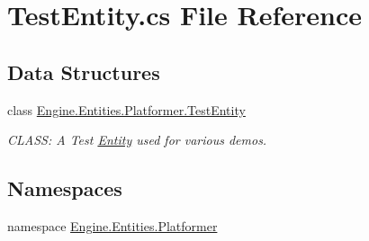 \hypertarget{a00029}{}\section{Test\+Entity.\+cs File Reference}
\label{a00029}
\subsection*{Data Structures}
\begin{DoxyCompactItemize}
\item 
class \hyperlink{a00330}{Engine.\+Entities.\+Platformer.\+Test\+Entity}
\begin{DoxyCompactList}\small\item\em C\+L\+A\+SS\+: A Test \hyperlink{a00314}{Entity} used for various demos. \end{DoxyCompactList}\end{DoxyCompactItemize}
\subsection*{Namespaces}
\begin{DoxyCompactItemize}
\item 
namespace \hyperlink{a00243}{Engine.\+Entities.\+Platformer}
\end{DoxyCompactItemize}

